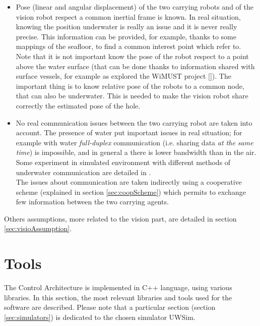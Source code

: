 \begin{itemize}
	\item Pose (linear and angular displacement) of the two carrying robots and of the vision robot respect a common inertial frame is known. In real situation, knowing the position underwater is really an issue and it is never really precise. This information can be provided, for example, thanks to some mappings of the seafloor, to find a common interest point which refer to. Note that it is not important know the pose of the robot respect to a point above the water surface (that can be done thanks to information shared with surface vessels, for example as explored the WiMUST project [\cite{wimust}]). The important thing is to know relative pose of the robots to a common node, that can also be underwater. This is needed to make the vision robot share correctly the estimated pose of the hole.
	
	\item No real communication issues between the two carrying robot are taken into account. The presence of water put important issues in real situation; for example with water \textit{full-duplex} communication (i.e. sharing data \textit{at the same time}) is impossible, and in general a there is lower bandwidth than in the air. Some experiment in simulated environment with different methods of underwater communication are detailed in \cite{IntroMaris2}.\\
	The issues about communication are taken indirectly using a cooperative scheme (explained in section \ref{sec:coopScheme}) which permits to exchange few information between the two carrying agents.
	
	
\end{itemize}

Others assumptions, more related to the vision part, are detailed in section \ref{sec:visioAssumption}.

\section{Tools}
The Control Architecture is implemented in C++ language, using various libraries. In this section, the most relevant libraries and tools used for the software are described. Please note that a particular section (section \ref{sec:simulators}) is dedicated to the chosen simulator UWSim.

